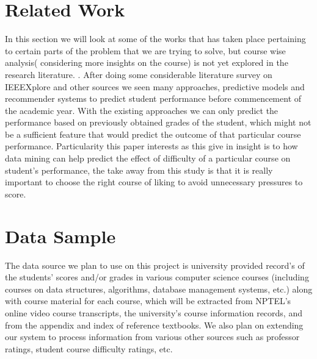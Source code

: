 \documentclass[conference]{IEEEtran}
\begin{document}
	\section{Related Work}
In this section we will look at some of the works that has taken place pertaining to certain parts of the problem that we are trying to solve, but course wise analysis( considering more insights on the course)  is not yet explored in the research literature. . After doing some considerable literature survey on IEEEXplore\cite{ieee} and other sources\cite{googleSch} we seen many approaches, predictive models and recommender systems to predict student performance before commencement of the academic year. \cite{ref:1} \cite{ref:2} \cite{ref:3} With the existing approaches we can only predict the performance based on previously obtained grades of the student, which might not be a sufficient feature that would predict the outcome of that particular course performance. Particularity this paper\cite{ref:3} interests as this give in insight is to how data mining can help predict the effect of difficulty of a particular course on student's performance, the take away from this study is that it is really important to choose the right course of liking to avoid unnecessary pressures to score.
	
	\section{Data Sample}
The data source we plan to use on this project is university provided record's of the students' scores and/or grades in various computer science courses (including courses on data structures, algorithms, database management systems, etc.) along with course material for each course, which will be extracted from NPTEL's online video course transcripts, the university's course information records, and from the appendix and index of reference textbooks. We also plan on extending our system to process information from various other sources such as professor ratings, student course difficulty ratings, etc.
\end{document}
